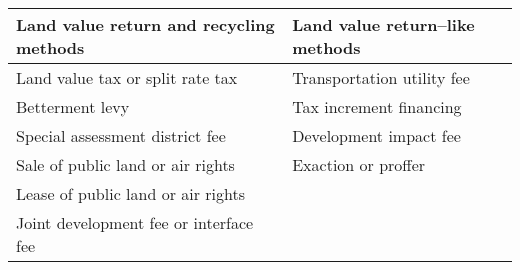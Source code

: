 \documentclass[12pt,]{article}
\begin{document}
\begin{longtable}[]{@{}ll@{}}
\toprule
\begin{minipage}[b]{0.52\columnwidth}\raggedright
Land value return and recycling methods\strut
\end{minipage} & \begin{minipage}[b]{0.37\columnwidth}\raggedright
Land value return--like methods\strut
\end{minipage}\tabularnewline
\midrule
\endhead
\begin{minipage}[t]{0.52\columnwidth}\raggedright
Land value tax or split rate tax\strut
\end{minipage} & \begin{minipage}[t]{0.37\columnwidth}\raggedright
Transportation utility fee\strut
\end{minipage}\tabularnewline
\begin{minipage}[t]{0.52\columnwidth}\raggedright
Betterment levy\strut
\end{minipage} & \begin{minipage}[t]{0.37\columnwidth}\raggedright
Tax increment financing\strut
\end{minipage}\tabularnewline
\begin{minipage}[t]{0.52\columnwidth}\raggedright
Special assessment district fee\strut
\end{minipage} & \begin{minipage}[t]{0.37\columnwidth}\raggedright
Development impact fee\strut
\end{minipage}\tabularnewline
\begin{minipage}[t]{0.52\columnwidth}\raggedright
Sale of public land or air rights\strut
\end{minipage} & \begin{minipage}[t]{0.37\columnwidth}\raggedright
Exaction or proffer\strut
\end{minipage}\tabularnewline
\begin{minipage}[t]{0.52\columnwidth}\raggedright
Lease of public land or air rights\strut
\end{minipage} & \begin{minipage}[t]{0.37\columnwidth}\raggedright
\strut
\end{minipage}\tabularnewline
\begin{minipage}[t]{0.52\columnwidth}\raggedright
Joint development fee or interface fee\strut
\end{minipage} & \begin{minipage}[t]{0.37\columnwidth}\raggedright
\strut
\end{minipage}\tabularnewline
\bottomrule
\end{longtable}
\end{document}
